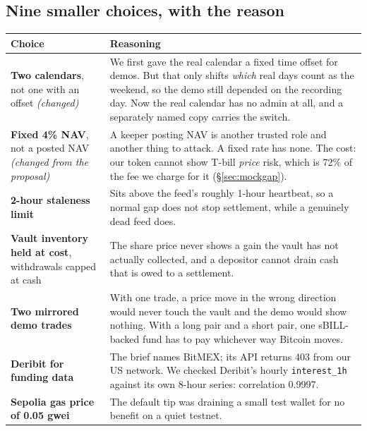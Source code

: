 \documentclass[11pt,a4paper]{article}
\begin{document}
\subsection{Nine smaller choices, with the reason}

\begin{center}
\small
\begin{tabular}{@{}p{3.6cm}p{11.8cm}@{}}
\toprule
\textbf{Choice} & \textbf{Reasoning} \\
\midrule
\textbf{Two calendars}, not one with an offset \emph{(changed)} &
We first gave the real calendar a fixed time offset for demos. But that only shifts \emph{which} real
days count as the weekend, so the demo still depended on the recording day. Now the real calendar has
no admin at all, and a separately named copy carries the switch. \\

\textbf{Fixed 4\% NAV}, not a posted NAV \emph{(changed from the proposal)} &
A keeper posting NAV is another trusted role and another thing to attack. A fixed rate has none. The
cost: our token cannot show T-bill \emph{price} risk, which is 72\% of the fee we charge for it
(\S\ref{sec:mockgap}). \\

\textbf{2-hour staleness limit} &
Sits above the feed's roughly 1-hour heartbeat, so a normal gap does not stop settlement, while a
genuinely dead feed does. \\

\textbf{Vault inventory held at cost}, withdrawals capped at cash &
The share price never shows a gain the vault has not actually collected, and a depositor cannot
drain cash that is owed to a settlement. \\

\textbf{Two mirrored demo trades} &
With one trade, a price move in the wrong direction would never touch the vault and the demo would
show nothing. With a long pair and a short pair, one sBILL-backed fund has to pay whichever way
Bitcoin moves. \\

\textbf{Deribit for funding data} &
The brief names BitMEX; its API returns 403 from our US network. We checked Deribit's hourly
\texttt{interest\_1h} against its own 8-hour series: correlation 0.9997. \\

\textbf{Sepolia gas price of 0.05 gwei} &
The default tip was draining a small test wallet for no benefit on a quiet testnet. \\


\end{tabular}
\end{center}
\end{document}
